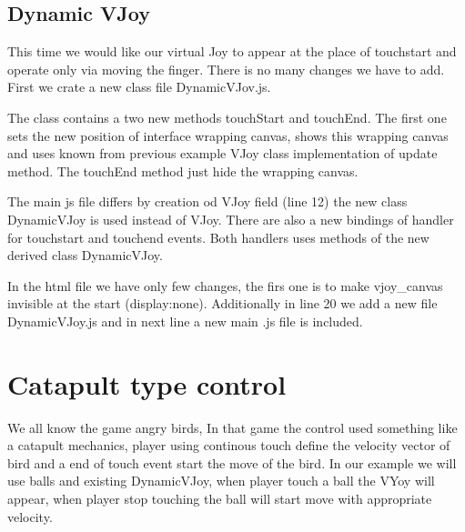 \subsection{Dynamic VJoy}
This time we would like our virtual Joy to appear at the place of touchstart and operate only via moving the finger. There is no many changes we have to add. First we crate a new class file DynamicVJov.js.


\begin{explain}
The class contains a two new methods touchStart and touchEnd. The first one sets the new position of interface wrapping canvas, shows this wrapping canvas and uses known from previous example VJoy class implementation of update method. The touchEnd method just hide the wrapping canvas.
\end{explain}


\begin{explain}
The main js file differs by creation od VJoy field (line 12) the new class DynamicVJoy is used instead of VJoy. There are also a new bindings of handler for touchstart and touchend events. Both handlers uses methods of the new derived class DynamicVJoy.
\end{explain}


\begin{explain}
In the html file we have only few changes, the firs one is to make vjoy\_canvas invisible at the start (display:none). Additionally in line 20 we add a new file DynamicVJoy.js and in next line a new main .js file is included.
\end{explain}

\section{Catapult type control}

We all know the game angry birds, In that game the control used something like a catapult mechanics, player using continous touch define the velocity vector of bird and a end of touch event start the move of the bird. In our example we will use balls and existing DynamicVJoy, when player touch a ball the VYoy will appear, when player stop touching the ball will start move with appropriate velocity.

